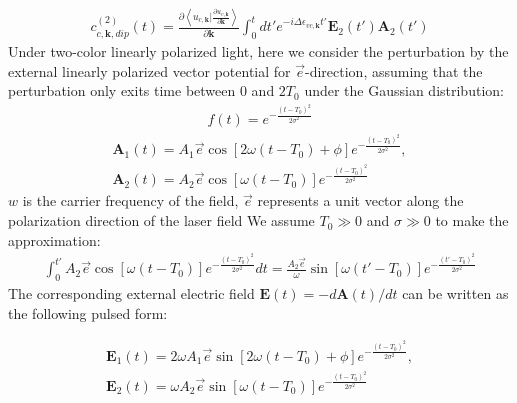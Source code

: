 \begin{align}
     c^{(2)}_{c,\mathbf k,dip}(t) =  \frac{\partial \left \langle u_{c,\mathbf k}\Big |\frac{\partial u_{v,\mathbf k}}{\partial \mathbf k} \right \rangle}{\partial \mathbf k}   \int_0^t dt' e^{-i \Delta \epsilon_{vc,\mathbf k}t'}\mathbf E_2(t')  \mathbf A_2(t') 
    \label{second_dip}
\end{align}
Under two-color linearly polarized light, here we consider the perturbation by the external linearly polarized vector potential for $\vec e$-direction, assuming that the perturbation only exits time between 0 and $2T_0$ under the Gaussian distribution:
\begin{align}
f(t)=e^{-\frac{(t-T_0)^2}{2\sigma^2}}    
\end{align}
\begin{align}
   \mathbf A_1(t)=A_1 \vec e \cos[2\omega(t-T_0)+\phi]  e^{-\frac{(t-T_0)^2}{2\sigma^2}}, \\
   \mathbf A_2(t)=A_2 \vec e \cos[\omega(t-T_0)]  e^{-\frac{(t-T_0)^2}{2\sigma^2}}
   \label{vector}
\end{align}
$w$ is the carrier frequency of the field,  $\vec{e}$ represents a unit vector along the polarization direction of the laser field
We assume $T_0\gg0$ and $\sigma\gg0$ to make the approximation:
\begin{align}
    \int_0^{t'} A_2 \vec e \cos[\omega(t-T_0)]  e^{-\frac{(t-T_0)^2}{2\sigma^2}} dt = \frac{A_2 \vec e}{\omega} \sin[\omega(t'-T_0)]  e^{-\frac{(t'-T_0)^2}{2\sigma^2}}    
\end{align}
The corresponding external electric field $\mathbf E(t)=-d\mathbf A(t)/dt$ can be written as the following pulsed form:

\begin{align}
   \mathbf E_1(t)=2\omega A_1 \vec e \sin[2\omega (t-T_0)+\phi]  e^{-\frac{(t-T_0)^2}{2\sigma^2}}, \\
   \mathbf E_2(t)=\omega A_2 \vec e \sin[\omega (t-T_0)]  e^{-\frac{(t-T_0)^2}{2\sigma^2}}
   \label{feild}
\end{align}

